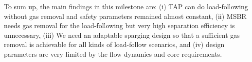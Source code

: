     To sum up, the main findings in this milestone are: (i) TAP can do 
    load-following without gas removal and safety parameters remained almost 
    constant, (ii) MSBR needs gas removal for the load-following but very high 
    separation efficiency is unnecessary, (iii) We need an adaptable sparging 
    design so that a sufficient gas removal is achievable for all kinds of 
    load-follow scenarios, and (iv) design parameters are very limited by the 
    flow dynamics and core requirements.
